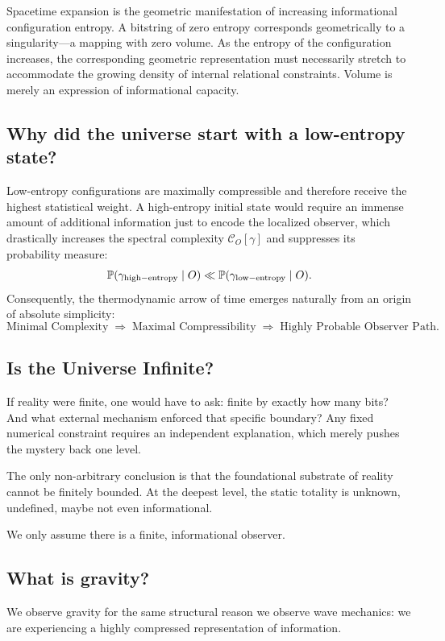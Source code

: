 Spacetime expansion is the geometric manifestation of increasing informational configuration entropy.
A bitstring of zero entropy corresponds geometrically to a singularity—a mapping with zero volume.
As the entropy of the configuration increases, the corresponding geometric representation must necessarily stretch to accommodate the growing density of internal relational constraints.
Volume is merely an expression of informational capacity.


\subsection*{Why did the universe start with a low-entropy state?}

Low-entropy configurations are maximally compressible and therefore receive the highest statistical weight.
A high-entropy initial state would require an immense amount of additional information just to encode the localized observer, which drastically increases the spectral complexity $\mathcal{C}_O[\gamma]$ and suppresses its probability measure:
\[
\mathbb{P}(\gamma_{\rm high-entropy} \mid O) \ll \mathbb{P}(\gamma_{\rm low-entropy} \mid O).
\]
Consequently, the thermodynamic arrow of time emerges naturally from an origin of absolute simplicity:
\[
\text{Minimal Complexity} \;\Rightarrow\; \text{Maximal Compressibility} \;\Rightarrow\; \text{Highly Probable Observer Path}.
\]


\subsection*{Is the Universe Infinite?}

If reality were finite, one would have to ask: finite by exactly how many bits?
And what external mechanism enforced that specific boundary?
Any fixed numerical constraint requires an independent explanation, which merely pushes the mystery back one level. 

The only non-arbitrary conclusion is that the foundational substrate of reality cannot be finitely bounded.
At the deepest level, the static totality is unknown, undefined, maybe not even informational.

We only assume there is a finite, informational observer.


\subsection*{What is gravity?}

We observe gravity for the same structural reason we observe wave mechanics: we are experiencing a highly compressed representation of information. 

